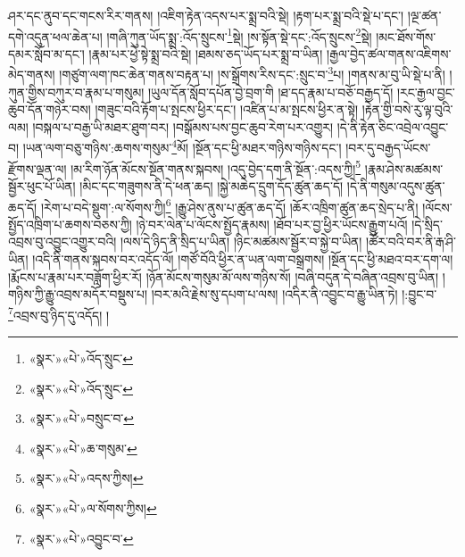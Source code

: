 ཤར་དང་ནུབ་དང་གངས་རིར་གནས། །འཇིག་རྟེན་འདས་པར་སྨྲ་བའི་སྡེ། །རྟག་པར་སྨྲ་བའི་སྡེ་པ་དང་། །ལྔ་ཚན་དགེ་འདུན་ཕལ་ཆེན་པ། །གཞི་ཀུན་ཡོད་སྨྲ་:འོད་སྲུངས་\footnote{«སྣར་»«པེ་»འོད་སྲུང་}སྡེ། །ས་སྟོན་སྡེ་དང་:འོད་སྲུངས་\footnote{«སྣར་»«པེ་»འོད་སྲུང་}སྡེ། །མང་ཐོས་གོས་དམར་སློབ་མ་དང་། །རྣམ་པར་ཕྱེ་སྟེ་སྨྲ་བའི་སྡེ། །ཐམས་ཅད་ཡོད་པར་སྨྲ་བ་ཡིན། །རྒྱལ་བྱེད་ཚལ་གནས་འཇིགས་མེད་གནས། །གཙུག་ལག་ཁང་ཆེན་གནས་བརྟན་པ། །ས་སྒྲོགས་རིས་དང་:སྲུང་བ་\footnote{«སྣར་»«པེ་»བསྲུང་བ་}པ། །གནས་མ་བུ་ཡི་སྡེ་པ་ནི། །ཀུན་གྱིས་བཀུར་བ་རྣམ་པ་གསུམ། །ཡུལ་དོན་སློབ་དཔོན་བྱེ་བྲག་གི །ཐ་དད་རྣམ་པ་བཅོ་བརྒྱད་དོ། །རང་རྒྱལ་བྱང་ཆུབ་དོན་གཉེར་བས། །གཟུང་བའི་རྟོག་པ་སྤངས་ཕྱིར་དང་། །འཛིན་པ་མ་སྤངས་ཕྱིར་ན་སྟེ། །རྟེན་གྱི་བསེ་རུ་ལྟ་བུའི་ལམ། །བསྐལ་པ་བརྒྱ་ཡི་མཐར་ཐུག་བར། །བསྒོམས་པས་བྱང་ཆུབ་རེག་པར་འགྱུར། །དེ་ནི་རྟེན་ཅིང་འབྲེལ་འབྱུང་བ། །ཡན་ལག་བཅུ་གཉིས་:ཆགས་གསུམ་\footnote{«སྣར་»«པེ་»ཆ་གསུམ་}མོ། །སྔོན་དང་ཕྱི་མཐར་གཉིས་གཉིས་དང་། །བར་དུ་བརྒྱད་ཡོངས་རྫོགས་ལྡན་ལ། །མ་རིག་ཉོན་མོངས་སྔོན་གནས་སྐབས། །འདུ་བྱེད་དག་ནི་སྔོན་:འདས་ཀྱི།\footnote{«སྣར་»«པེ་»འདས་ཀྱིས།} །རྣམ་ཤེས་མཚམས་སྦྱོར་ཕུང་པོ་ཡིན། །མིང་དང་གཟུགས་ནི་དེ་ཕན་ཆད། །སྐྱེ་མཆེད་དྲུག་དོད་ཚུན་ཆད་དོ། །དེ་ནི་གསུམ་འདུས་ཚུན་ཆད་དོ། །རེག་པ་བདེ་སྡུག་:ལ་སོགས་ཀྱི།\footnote{«སྣར་»«པེ་»ལ་སོགས་ཀྱིས།} །རྒྱུ་ཤེས་ནུས་པ་ཚུན་ཆད་དོ། །ཆོར་འཁྲིག་ཚུན་ཆད་སྲེད་པ་ནི། །ལོངས་སྤྱོད་འཁྲིག་པ་ཆགས་བཅས་ཀྱི། །ཉེ་བར་ལེན་པ་ལོངས་སྤྱོད་རྣམས། །ཐོབ་པར་བྱ་ཕྱིར་ཡོངས་རྒྱུག་པའོ། །དེ་སྲིད་འབྲས་བུ་འབྱུང་འགྱུར་བའི། །ལས་དེ་ཉིད་ནི་སྲིད་པ་ཡིན། །ཉིང་མཚམས་སྦྱོར་བ་སྐྱེ་བ་ཡིན། །ཚོར་བའི་བར་ནི་རྒ་ཤི་ཡིན། །འདི་ནི་གནས་སྐབས་བར་འདོད་ལོ། །གཙོ་བོའི་ཕྱིར་ན་ཡན་ལག་བསྒྲགས། །སྔོན་དང་ཕྱི་མཐའ་བར་དག་ལ། །རྨོངས་པ་རྣམ་པར་བཟློག་ཕྱིར་རོ། །ཉོན་མོངས་གསུམ་མོ་ལས་གཉིས་སོ། །བཞི་བདུན་དེ་བཞིན་འབྲས་བུ་ཡིན། །གཉིས་ཀྱི་རྒྱུ་འབྲས་མདོར་བསྡུས་པ། །བར་མའི་རྗེས་སུ་དཔག་པ་ལས། །འདིར་ནི་འབྱུང་བ་རྒྱུ་ཡིན་ཏེ། །:བྱུང་བ་\footnote{«སྣར་»«པེ་»འབྱུང་བ་}འབྲས་བུ་ཉིད་དུ་འདོད། །
